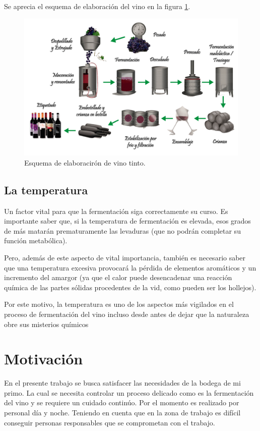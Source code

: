 Se aprecia el esquema de elaboración del vino en la figura \ref{fig:winep}.

\begin{figure}[hp]
  \centering
  \includegraphics[scale=.3]{./Figures/elaboracion-del-vino-tinto.png}
  \caption{Esquema de elaboracirón de vino tinto.}
  \label{fig:winep}
\end{figure}


\subsection{La temperatura}

  Un factor vital para que la fermentación siga correctamente su curso. Es importante saber que, si la temperatura de fermentación es elevada, esos grados de más matarán prematuramente las levaduras (que no podrán completar su función metabólica).

  Pero, además de este aspecto de vital importancia, también es necesario saber que una temperatura excesiva provocará la pérdida de elementos aromáticos y un incremento del amargor (ya que el calor puede desencadenar una reacción química de las partes sólidas procedentes de la vid, como pueden ser los hollejos).

  Por este motivo, la temperatura es uno de los aspectos más vigilados en el proceso de fermentación del vino incluso desde antes de dejar que la naturaleza obre sus misterios químicos


\section{Motivación}

En el presente trabajo se busca satisfacer las necesidades de la bodega de mi primo. La cual se necesita controlar un proceso delicado como es la fermentación del vino y se requiere un cuidado continúo. Por el momento es realizado por personal día y noche. Teniendo en cuenta que en la zona de trabajo es difícil conseguir personas responsables que se comprometan con el trabajo. 

